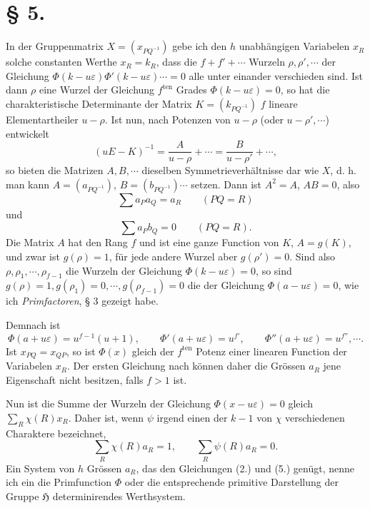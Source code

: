 \documentclass[11pt]{article}
\newcommand{\Hgr}{\mathfrak{H}}
\newcommand{\eps}{\varepsilon}
\newcommand{\ten}{\mathrm{ten}}
\begin{document}
\section*{§ 5.}

In der Gruppenmatrix $X=(x_{PQ^{-1}})$ gebe ich den $h$ unabhängigen Variabelen $x_R$ solche constanten Werthe $x_R=k_R$, dass die $f+f'+\cdots$ Wurzeln $\rho,\rho',\cdots$ der Gleichung $\Phi(k-u\eps)\Phi'(k-u\eps)\cdots=0$ alle unter einander verschieden sind. Ist dann $\rho$ eine Wurzel der Gleichung $f^{\ten}$ Grades $\Phi(k-u\eps)=0$, so hat die charakteristische Determinante der Matrix $K=(k_{PQ^{-1}})$ $f$ lineare Elementartheiler $u-\rho$. Ist nun, nach Potenzen von $u-\rho$ (oder $u-\rho',\cdots$) entwickelt
\begin{equation}\tag{1.}
(uE-K)^{-1}=\frac{A}{u-\rho}+\cdots=\frac{B}{u-\rho'}+\cdots,
\end{equation}
so bieten die Matrizen $A,B,\cdots$ dieselben Symmetrieverhältnisse dar wie $X$, d. h. man kann $A=(a_{PQ^{-1}})$, $B=(b_{PQ^{-1}})\cdots$ setzen. Dann ist $A^2=A$, $AB=0$, also
\begin{equation}\tag{2.}
\sum a_Pa_Q=a_R\qquad(PQ=R)
\end{equation}
und
\begin{equation}\tag{3.}
\sum a_Pb_Q=0\qquad(PQ=R).
\end{equation}
Die Matrix $A$ hat den Rang $f$ und ist eine ganze Function von $K$, $A=g(K)$, und zwar ist $g(\rho)=1$, für jede andere Wurzel aber $g(\rho')=0$. Sind also $\rho,\rho_1,\cdots,\rho_{f-1}$ die Wurzeln der Gleichung $\Phi(k-u\eps)=0$, so sind $g(\rho)=1,g(\rho_1)=0,\cdots,g(\rho_{f-1})=0$ die der Gleichung $\Phi(a-u\eps)=0$, wie ich \emph{Primfactoren}, § 3 gezeigt habe.

Demnach ist
\begin{equation}\tag{4.}
\Phi(a+u\eps)=u^{f-1}(u+1),
\qquad
\Phi'(a+u\eps)=u^{f'},
\qquad
\Phi''(a+u\eps)=u^{f''},\cdots .
\end{equation}
Ist $x_{PQ}=x_{QP}$, so ist $\Phi(x)$ gleich der $f^{\ten}$ Potenz einer linearen Function der Variabelen $x_R$. Der ersten Gleichung nach können daher die Grössen $a_R$ jene Eigenschaft nicht besitzen, falls $f>1$ ist.

Nun ist die Summe der Wurzeln der Gleichung $\Phi(x-u\eps)=0$ gleich $\sum_R\chi(R)x_R$. Daher ist, wenn $\psi$ irgend einen der $k-1$ von $\chi$ verschiedenen Charaktere bezeichnet,
\begin{equation}\tag{5.}
\sum_R\chi(R)a_R=1,
\qquad
\sum_R\psi(R)a_R=0.
\end{equation}
Ein System von $h$ Grössen $a_R$, das den Gleichungen (2.) und (5.) genügt, nenne ich ein die Primfunction $\Phi$ oder die entsprechende primitive Darstellung der Gruppe $\Hgr$ determinirendes Werthsystem.
\end{document}
